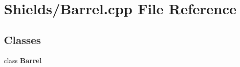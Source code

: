 \section{Shields/\-Barrel.cpp File Reference}
\label{_barrel_8cpp}
\subsection*{Classes}
\begin{DoxyCompactItemize}
\item 
class {\bf Barrel}
\end{DoxyCompactItemize}
